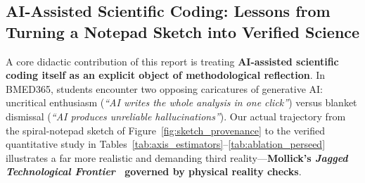 \documentclass[10pt,a4paper]{article}
\renewcommand{\_}{\origunderscore\allowbreak}
\begin{document}
\subsection{AI-Assisted Scientific Coding: Lessons from Turning a Notepad Sketch into Verified Science}
\label{sec:disc_ai}

A core didactic contribution of this report is treating \textbf{AI-assisted scientific coding itself as an explicit object of methodological reflection}. In BMED365, students encounter two opposing caricatures of generative AI: uncritical enthusiasm (\emph{``AI writes the whole analysis in one click''}) versus blanket dismissal (\emph{``AI produces unreliable hallucinations''}). Our actual trajectory from the spiral-notepad sketch of Figure~\ref{fig:sketch_provenance} to the verified quantitative study in Tables~\ref{tab:axis_estimators}--\ref{tab:ablation_perseed} illustrates a far more realistic and demanding third reality---\textbf{Mollick's \emph{Jagged Technological Frontier}~\cite{dellacqua2023jagged,mollick2026coexistence} governed by physical reality checks}.
\end{document}
